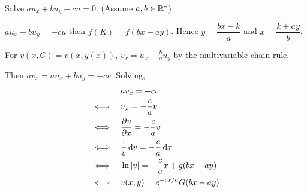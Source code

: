 Solve $au_x + bu_y + cu = 0$. (Assume $a,b \in \mathbb{R}^*$)

\soln* $au_x + bu_y = -cu$ then $f(K) = f(bx-ay)$. Hence $y = \dfrac{bx-k}{a}$ and $x = \dfrac{k+ay}{b}$.

\nl For $v(x,C) = v(x,y(x))$, $v_x = u_x + \frac{b}{a}u_y$ by the multivariable chain rule. 

\nl Then $av_x = au_x + bu_y = -cv$. Solving,
\begin{align*}
    \quad & av_x = -cv\\
    \iff \quad&  v_x = -\frac{c}{a}v\\
    \iff \quad&\pdv{v}{x} = -\frac{c}{a}v\\
    \iff \quad& \over{v} \dd{v} = -\frac{c}{a}\dd{x}\\
    \iff \quad&\ln \abs{v} = -\frac{c}{a}x + g(bx-ay)\\
\iff \quad & v(x,y) = e^{-cx/a}G(bx-ay)
\end{align*}